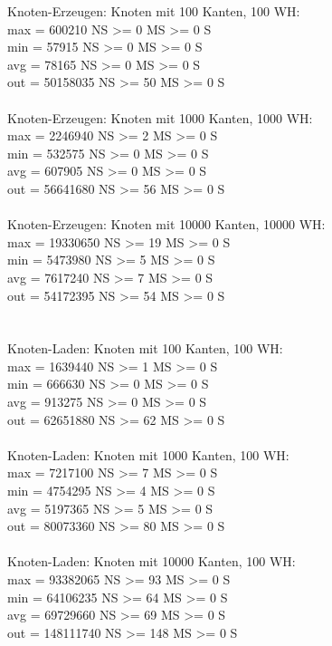 Knoten-Erzeugen: Knoten mit 100 Kanten, 100 WH:\\
max = 600210 NS >= 0 MS >= 0 S\\
min = 57915 NS >= 0 MS >= 0 S\\
avg = 78165 NS >= 0 MS >= 0 S\\
out = 50158035 NS >= 50 MS >= 0 S\\
~\\
Knoten-Erzeugen: Knoten mit 1000 Kanten, 1000 WH:\\
max = 2246940 NS >= 2 MS >= 0 S\\
min = 532575 NS >= 0 MS >= 0 S\\
avg = 607905 NS >= 0 MS >= 0 S\\
out = 56641680 NS >= 56 MS >= 0 S\\
~\\
Knoten-Erzeugen: Knoten mit 10000 Kanten, 10000 WH:\\
max = 19330650 NS >= 19 MS >= 0 S\\
min = 5473980 NS >= 5 MS >= 0 S\\
avg = 7617240 NS >= 7 MS >= 0 S\\
out = 54172395 NS >= 54 MS >= 0 S\\
~\\~\\


Knoten-Laden: Knoten mit 100 Kanten, 100 WH:\\
max = 1639440 NS >= 1 MS >= 0 S\\
min = 666630 NS >= 0 MS >= 0 S\\
avg = 913275 NS >= 0 MS >= 0 S\\
out = 62651880 NS >= 62 MS >= 0 S\\
~\\
Knoten-Laden: Knoten mit 1000 Kanten, 100 WH:\\
max = 7217100 NS >= 7 MS >= 0 S\\
min = 4754295 NS >= 4 MS >= 0 S\\
avg = 5197365 NS >= 5 MS >= 0 S\\
out = 80073360 NS >= 80 MS >= 0 S\\
~\\
Knoten-Laden: Knoten mit 10000 Kanten, 100 WH:\\
max = 93382065 NS >= 93 MS >= 0 S\\
min = 64106235 NS >= 64 MS >= 0 S\\
avg = 69729660 NS >= 69 MS >= 0 S\\
out = 148111740 NS >= 148 MS >= 0 S\\
~\\


